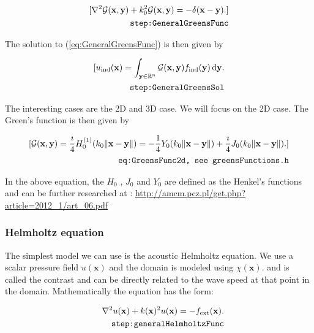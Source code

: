 \documentclass[10pt,a4paper]{article}
\newcommand{\df}[1]{\, \ensuremath{\mbox{d}#1}}
\begin{document}
\begin{align}
\label{eq:GeneralGreensFunc}
[ \nabla^2 \mathcal{G}(\mathbf{x}, \mathbf{y}) + k_0^2
\mathcal{G}(\mathbf{x}, \mathbf{y}) = -\delta(\mathbf{x} -
\mathbf{y}). ]\\
\tag*{\texttt{step:GeneralGreensFunc}}
\end{align}

The solution to (\ref{eq:GeneralGreensFunc}) is then given by

\begin{align} \label{eq:GeneralGreensSol}
[ u_\text{ind}(\mathbf{x}) =
\int_{\mathbf{y} \in \mathbb{R}^n} \mathcal{G}(\mathbf{x}, \mathbf{y})
f_\text{ind}(\mathbf{y}) \df{\mathbf{y}}.\\
\tag*{\texttt{step:GeneralGreensSol}}
\end{align}

The interesting cases are the 2D and 3D case. We will focus on the 2D case. The Green's function is then
given by

\begin{align} \label{eq:GreensFunc2d}[ \mathcal{G}(\mathbf{x}, \mathbf{y}) =
\frac{\imath}{4} H_0^{(1)}(k_0 \|\mathbf{x} - \mathbf{y}\|) =
-\frac{1}{4} Y_0(k_0 \|\mathbf{x} - \mathbf{y}\|) + \frac{\imath}{4}
J_0(k_0 \|\mathbf{x} - \mathbf{y}\|).  ]\\
\tag*{\texttt{eq:GreensFunc2d, see greensFunctions.h}}
\end{align}

In the above equation, the $H_0$ , $J_0$ and $Y_0$ are defined as the
Henkel's functions and can be further researched at :
\url{http://amcm.pcz.pl/get.php?article=2012_1/art_06.pdf}

\subsubsection{Helmholtz equation}
The simplest model we can use is the acoustic Helmholtz equation. We
use a scalar pressure field $u(\mathbf{x})$ and the domain is modeled
using $\chi(\mathbf{x})$. and is called the contrast and can be
directly related to the wave speed at that point in the domain.
Mathematically the equation has the form:

\begin{align} \label{eq:generalHelmholtzFunc}
\nabla^2 u(\mathbf{x}) + k(\mathbf{x})^2 u(\mathbf{x}) =
-f_{\text{ext}}(\mathbf{x}).\\
\tag*{\texttt{step:generalHelmholtzFunc}}
\end{align}
\end{document}
